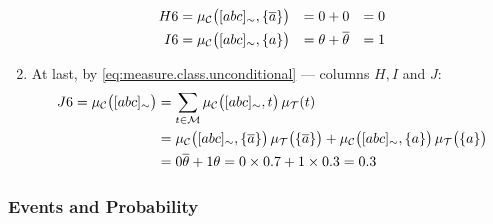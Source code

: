 \documentclass[x11names]{tlp}
\begin{document}
\begin{example}
\begin{enumerate}
\begin{equation*}
				      \begin{aligned}
					      H6
					       & = \pwc{\class{abc}, \set{\co{a}}}
					       & = 0 + 0
					       &
					       & = 0                               %
					      \\
					      I6
					       & = \pwc{\class{abc}, \set{a}}
					       & = \theta + \co{\theta}
					       &
					       & = 1
				      \end{aligned}
			      \end{equation*}
			\item At last, by \cref{eq:measure.class.unconditional} --- columns $H, I$ and $J$:
			      \begin{equation*}
				      \begin{split}
					      J6 = \pwc{\class{abc}}
					       & = \sum_{t\in\MODELset} \pwc{\class{abc}, t}\pwt{t}                %
					      \\
					       & =  \pwc{\class{abc}, \set{\co{a}}}\pwt{\set{\co{a}}} +
					      \pwc{\class{abc}, \set{a}}\pwt{\set{a}}%
					      \\
					       & =  0 \co{\theta} +  1 \theta =  0 \times 0.7 +  1\times 0.3 = 0.3
				      \end{split}
			      \end{equation*}
		\end{enumerate}
	\end{example}
\fi

\subsubsection*{Events and Probability}
\label{par:propagation.event.cases}
\end{document}
